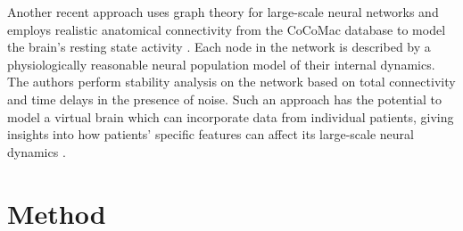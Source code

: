 \documentclass[]{article}
\begin{document}
Another recent approach uses graph theory \cite{Albert2002,Bang-Jensen2010} for large-scale neural networks and employs realistic anatomical connectivity from the CoCoMac database \cite{Kotter2004} to model the brain's resting state activity \cite{Ghosh2008,Deco2009}. Each node in the network is described by a physiologically reasonable neural population model of their internal dynamics. The authors perform stability analysis on the network based on total connectivity and time delays in the presence of noise. Such an approach has the potential to model a virtual brain which can incorporate data from individual patients, giving insights into how patients' specific features can affect its large-scale neural dynamics \cite{Jirsa2010,Deco2010}.

\section{Method}
\end{document}
